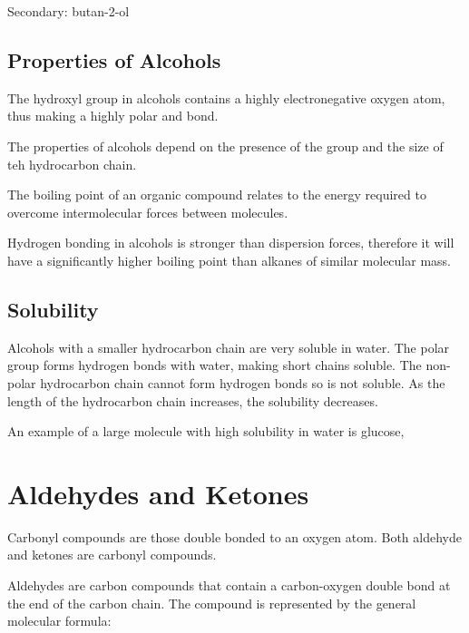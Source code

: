 		Secondary: butan-2-ol

		\begin{center}
		\end{center}

	\subsection{Properties of Alcohols}
	
		The hydroxyl group in alcohols contains a highly electronegative oxygen atom, thus making a highly polar  and  bond.

		The properties of alcohols depend on the presence of the  group and the size of teh hydrocarbon chain.

		The boiling point of an organic compound relates to the energy required to overcome intermolecular forces between molecules.

		Hydrogen bonding in alcohols is stronger than dispersion forces, therefore it will have a significantly higher boiling point than alkanes of similar molecular mass.

	\subsection{Solubility}
	
		Alcohols with a smaller hydrocarbon chain are very soluble in water. The polar  group forms hydrogen bonds with water, making short chains soluble. The non-polar hydrocarbon chain cannot form hydrogen bonds so is not soluble. As the length of the hydrocarbon chain increases, the solubility decreases.

		An example of a large molecule with high solubility in water is glucose, 

\section{Aldehydes and Ketones} \label{12/05/2025}

	Carbonyl compounds are those double bonded to an oxygen atom. Both aldehyde and ketones are carbonyl compounds.

	Aldehydes are carbon compounds that contain a carbon-oxygen double bond at the end of the carbon chain. The compound is represented by the general molecular formula:

	\begin{center}
	\end{center}


